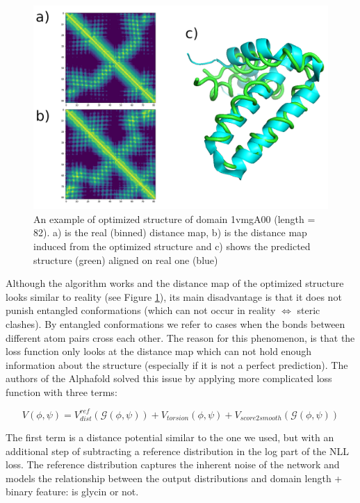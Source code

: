 \begin{figure}
    \centering
    \includegraphics[width=0.8\linewidth]{imgs_tomas/1vmg_ensemble.png}
    \caption{An example of optimized structure of domain 1vmgA00 (length = 82). a) is the real (binned) distance map, b) is the distance map induced from the optimized structure and c) shows the predicted structure (green) aligned on real one (blue)}
    \label{fig:1vmg}
\end{figure}

Although the algorithm works and the distance map of the optimized structure looks similar to reality (see Figure \ref{fig:1vmg}), its main disadvantage is that it does not punish entangled conformations (which can not occur in reality $\Leftrightarrow$ steric clashes). By entangled conformations we refer to cases when the bonds between different atom pairs cross each other. The reason for this phenomenon, is that the loss function only looks at the distance map which can not hold enough information about the structure (especially if it is not a perfect prediction). The authors of the Alphafold solved this issue by applying more complicated loss function with three terms:

\begin{equation}
    V(\phi, \psi) = V_{dist}^{ref}(\mathcal{G}(\phi, \psi)) + V_{torsion}(\phi, \psi) + V_{score2smooth}(\mathcal{G}(\phi, \psi))
    \label{eq:alphafold_potential}
\end{equation}

The first term is a distance potential similar to the one we used, but with an additional step of subtracting a reference distribution in the log part of the NLL loss. The reference distribution captures the inherent noise of the network and models the relationship between the output distributions and domain length + binary feature: is glycin or not.

